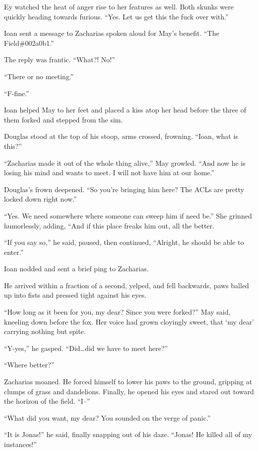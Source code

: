 Ey watched the heat of anger rise to her features as well. Both skunks were quickly heading towards furious. ``Yes. Let us get this the fuck over with.''

Ioan sent a message to Zacharias spoken aloud for May's benefit. ``The Field\#002a0b1.''

The reply was frantic. ``What?! No!''

``There or no meeting.''

``F-fine.''

Ioan helped May to her feet and placed a kiss atop her head before the three of them forked and stepped from the sim.

Douglas stood at the top of his stoop, arms crossed, frowning. ``Ioan, what is this?''

``Zacharias made it out of the whole thing alive,'' May growled. ``And now he is losing his mind and wants to meet. I will not have him at our home.''

Douglas's frown deepened. ``So you're bringing him here? The ACLs are pretty locked down right now.''

``Yes. We need somewhere where someone can sweep him if need be.'' She grinned humorlessly, adding, ``And if this place freaks him out, all the better.

``If you say so,'' he said, paused, then continued, ``Alright, he should be able to enter.''

Ioan nodded and sent a brief ping to Zacharias.

He arrived within a fraction of a second, yelped, and fell backwards, paws balled up into fists and pressed tight against his eyes.

``How long as it been for you, my dear? Since you were forked?'' May said, kneeling down before the fox. Her voice had grown cloyingly sweet, that `my dear' carrying nothing but spite.

``Y-yes,'' he gasped. ``Did\ldots did we have to meet here?''

``Where better?''

Zacharias moaned. He forced himself to lower his paws to the ground, gripping at clumps of grass and dandelions. Finally, he opened his eyes and stared out toward the horizon of the field. ``I--''

``What did you want, my dear? You sounded on the verge of panic.''

``It is Jonas!'' he said, finally snapping out of his daze. ``Jonas! He killed all of my instances!''

